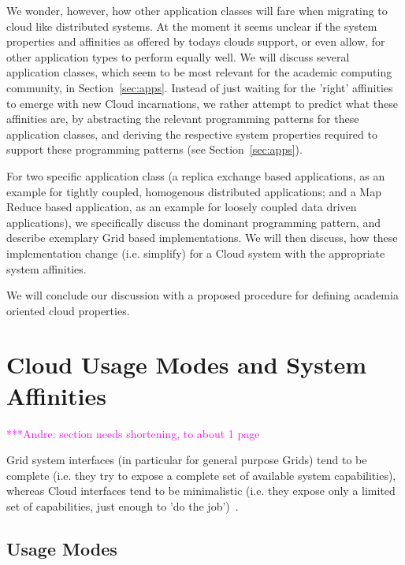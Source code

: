 \documentclass{article}
\newcommand{\amnote}[1]{   {\textcolor{magenta}{ ***Andre:    #1 }}}
\newcommand{\amnote}[1]{}
\begin{document}
 We wonder, however, how other application classes will fare when
 migrating to cloud like distributed systems.  At the moment it
 seems unclear if the system properties and affinities as offered by
 todays clouds support, or even allow, for other application types to
 perform equally well.  We will discuss several application classes,
 which seem to be most relevant for the academic computing community,
 in Section~\ref{sec:apps}.  Instead of just waiting for the 'right'
 affinities to emerge with new Cloud incarnations, we rather attempt
 to predict what these affinities are, by abstracting the relevant
 programming patterns for these application classes, and deriving the
 respective system properties required to support these programming
 patterns (see Section~\ref{sec:apps}).  
 
 For two specific application class (a replica exchange based
 applications, as an example for tightly coupled, homogenous
 distributed applications; and a Map Reduce based application,
 as an example for loosely coupled data driven applications), we
 specifically discuss the dominant programming pattern, and
 describe exemplary Grid based implementations.  We will then
 discuss, how these implementation change (i.e. simplify) for
 a Cloud system with the appropriate system affinities.  

 We will conclude our discussion with a proposed procedure for
 defining academia oriented cloud properties.


\section{Cloud Usage Modes and System Affinities}
\label{sec:affine}
 
 \amnote{section needs shortening, to about 1 page}
 
 Grid system interfaces (in particular for general purpose Grids) tend
 to be complete (i.e. they try to expose a complete set of available
 system capabilities), whereas Cloud interfaces tend to be
 minimalistic (i.e. they expose only a limited set of capabilities,
 just enough to 'do the job')~\cite{cloud-saga-paper}.
 
 \subsection{Usage Modes}
\end{document}
